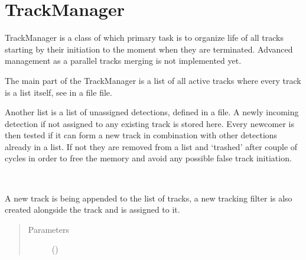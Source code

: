 \documentclass[letterpaper,10pt,english]{sphinxmanual}
\begin{document}
\section{TrackManager}
\label{\detokenize{trackmanagement:trackmanager}}
TrackManager is a class of which primary task is to organize life of all tracks starting by their initiation to
the moment when they are terminated. Advanced management as a parallel tracks merging is not implemented yet.

The main part of the TrackManager is a list of all active tracks where every track is a list itself, see
{\hyperref[\detokenize{datacontainers:data_containers.Track}]{}} in a file {\hyperref[\detokenize{datacontainers::doc}]{}} file.

Another list is a list of unassigned detections, {\hyperref[\detokenize{datacontainers:data_containers.UnAssignedDetectionList}]{}} defined in a
{\hyperref[\detokenize{datacontainers::doc}]{}} file. A newly incoming detection if not assigned to any existing track is
stored here. Every newcomer is then tested if it can form a new track in combination with other detections already
in a list. If not they are removed from a list and ‘trashed’ after couple of cycles in order to free the memory and avoid
any possible false track initiation.

\begin{fulllineitems}
\label{\detokenize{trackmanagement:track_management.TrackManager}}~

\begin{fulllineitems}
\label{\detokenize{trackmanagement:track_management.TrackManager.append_track}}
A new track is being appended to the list of tracks, a new tracking filter is also created
alongside the track and is assigned to it.
\begin{quote}\begin{description}
\item[{Parameters}] \leavevmode
{} ({\hyperref[\detokenize{datacontainers:data_containers.Track}]{}}) \textendash{} 

\end{description}\end{quote}

\end{fulllineitems}


\end{fulllineitems}
\end{document}

